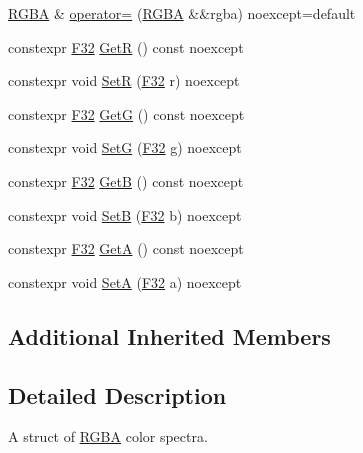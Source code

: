 \begin{DoxyCompactItemize}
\item 
\mbox{\hyperlink{structmage_1_1_r_g_b_a}{R\+G\+BA}} \& \mbox{\hyperlink{structmage_1_1_r_g_b_a_afcac58d6a76659c2a5821b8c957fc90e}{operator=}} (\mbox{\hyperlink{structmage_1_1_r_g_b_a}{R\+G\+BA}} \&\&rgba) noexcept=default
\item 
constexpr \mbox{\hyperlink{namespacemage_aa97e833b45f06d60a0a9c4fc22ae02c0}{F32}} \mbox{\hyperlink{structmage_1_1_r_g_b_a_a2f312fc862e792247bb6ba0e5a5390ca}{GetR}} () const noexcept
\item 
constexpr void \mbox{\hyperlink{structmage_1_1_r_g_b_a_a1de1796391b58e1e1db1e2701f8a391c}{SetR}} (\mbox{\hyperlink{namespacemage_aa97e833b45f06d60a0a9c4fc22ae02c0}{F32}} r) noexcept
\item 
constexpr \mbox{\hyperlink{namespacemage_aa97e833b45f06d60a0a9c4fc22ae02c0}{F32}} \mbox{\hyperlink{structmage_1_1_r_g_b_a_a39db7aa6065db1aef0c774316865e0ae}{GetG}} () const noexcept
\item 
constexpr void \mbox{\hyperlink{structmage_1_1_r_g_b_a_a18cdea53caccd27337bd0a1c31208b64}{SetG}} (\mbox{\hyperlink{namespacemage_aa97e833b45f06d60a0a9c4fc22ae02c0}{F32}} g) noexcept
\item 
constexpr \mbox{\hyperlink{namespacemage_aa97e833b45f06d60a0a9c4fc22ae02c0}{F32}} \mbox{\hyperlink{structmage_1_1_r_g_b_a_ae4fd67f400f6c86c5c7614ba3b06feeb}{GetB}} () const noexcept
\item 
constexpr void \mbox{\hyperlink{structmage_1_1_r_g_b_a_a3c7dccbc089f0a190f470c9dc74e7c51}{SetB}} (\mbox{\hyperlink{namespacemage_aa97e833b45f06d60a0a9c4fc22ae02c0}{F32}} b) noexcept
\item 
constexpr \mbox{\hyperlink{namespacemage_aa97e833b45f06d60a0a9c4fc22ae02c0}{F32}} \mbox{\hyperlink{structmage_1_1_r_g_b_a_a31196d863851f8e2b178458a78702b42}{GetA}} () const noexcept
\item 
constexpr void \mbox{\hyperlink{structmage_1_1_r_g_b_a_a3b2ebef3e0f2d26707b0fb84de8aec12}{SetA}} (\mbox{\hyperlink{namespacemage_aa97e833b45f06d60a0a9c4fc22ae02c0}{F32}} a) noexcept
\end{DoxyCompactItemize}
\subsection*{Additional Inherited Members}


\subsection{Detailed Description}
A struct of \mbox{\hyperlink{structmage_1_1_r_g_b_a}{R\+G\+BA}} color spectra. 


